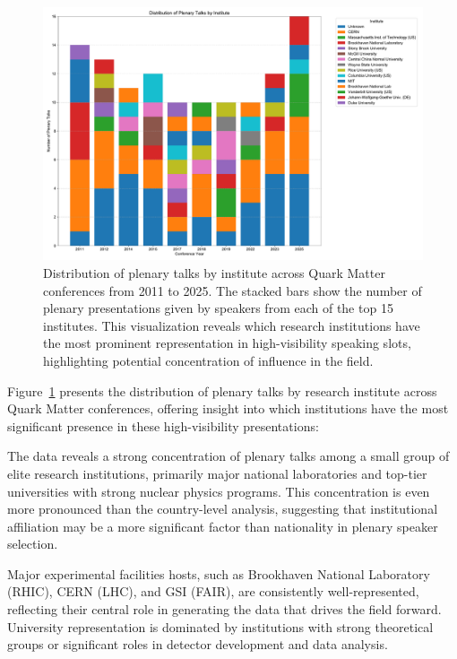 \documentclass[a4paper,11pt]{article}
\begin{document}
\begin{figure}[H]
\centering
\includegraphics[width=\textwidth]{figures/plenary_talks_by_institute.pdf}
\caption{Distribution of plenary talks by institute across Quark Matter conferences from 2011 to 2025. The stacked bars show the number of plenary presentations given by speakers from each of the top 15 institutes. This visualization reveals which research institutions have the most prominent representation in high-visibility speaking slots, highlighting potential concentration of influence in the field.}
\label{fig:institute_plenary}
\end{figure}

Figure~\ref{fig:institute_plenary} presents the distribution of plenary talks by research institute across Quark Matter conferences, offering insight into which institutions have the most significant presence in these high-visibility presentations:

The data reveals a strong concentration of plenary talks among a small group of elite research institutions, primarily major national laboratories and top-tier universities with strong nuclear physics programs. This concentration is even more pronounced than the country-level analysis, suggesting that institutional affiliation may be a more significant factor than nationality in plenary speaker selection.

Major experimental facilities hosts, such as Brookhaven National Laboratory (RHIC), CERN (LHC), and GSI (FAIR), are consistently well-represented, reflecting their central role in generating the data that drives the field forward. University representation is dominated by institutions with strong theoretical groups or significant roles in detector development and data analysis.
\end{document}
